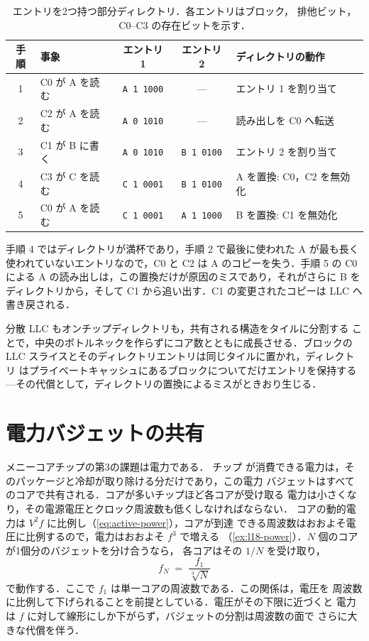 \documentclass[../main.tex]{subfiles}
\begin{document}
\begin{table}[htbp]
  \centering\small
  \caption{エントリを2つ持つ部分ディレクトリ．各エントリはブロック，
    排他ビット，C0--C3 の存在ビットを示す．}
  \label{tab:l22-directory-trace}
  \begin{tabular}{@{}clccl@{}}
    \toprule
    手順 & 事象 & エントリ 1 & エントリ 2 & ディレクトリの動作 \\
    \midrule
    1 & C0 が A を読む  & \texttt{A 1 1000} & ---               & エントリ 1 を割り当て \\
    2 & C2 が A を読む  & \texttt{A 0 1010} & ---               & 読み出しを C0 へ転送 \\
    3 & C1 が B に書く  & \texttt{A 0 1010} & \texttt{B 1 0100} & エントリ 2 を割り当て \\
    4 & C3 が C を読む  & \texttt{C 1 0001} & \texttt{B 1 0100} & A を置換: C0，C2 を無効化 \\
    5 & C0 が A を読む  & \texttt{C 1 0001} & \texttt{A 1 1000} & B を置換: C1 を無効化 \\
    \bottomrule
  \end{tabular}
\end{table}

手順 4 ではディレクトリが満杯であり，手順 2 で最後に使われた A が最も長く
使われていないエントリなので，C0 と C2 は A のコピーを失う．手順 5 の C0
による A の読み出しは，この置換だけが原因のミスであり，それがさらに B を
ディレクトリから，そして C1 から追い出す．C1 の変更されたコピーは LLC へ
書き戻される．

\begin{keypoint}
  分散 LLC もオンチップディレクトリも，共有される構造をタイルに分割する
  ことで，中央のボトルネックを作らずにコア数とともに成長させる．ブロックの
  LLC スライスとそのディレクトリエントリは同じタイルに置かれ，ディレクトリ
  はプライベートキャッシュにあるブロックについてだけエントリを保持する
  ---その代償として，ディレクトリの置換によるミスがときおり生じる．
\end{keypoint}

\section{電力バジェットの共有}
\label{sec:l22-power}

メニーコアチップの第3の課題は電力である．
チップ
が消費できる電力は，そのパッケージと冷却が取り除ける分だけであり，この電力
バジェットはすべてのコアで共有される．コアが多いチップほど各コアが受け取る
電力は小さくなり，その電源電圧とクロック周波数も低くしなければならない．
コアの動的電力は $V^{2}f$ に比例し（\cref{eq:active-power}），コアが到達
できる周波数はおおよそ電圧に比例するので，電力はおおよそ $f^{3}$ で増える
（\cref{ex:l18-power}）．$N$ 個のコアが1個分のバジェットを分け合うなら，
各コアはその $1/N$ を受け取り，
\begin{equation}
  f_{N} \;=\; \frac{f_{1}}{\sqrt[3]{N}}
  \label{eq:l22-freq}
\end{equation}
で動作する．ここで $f_{1}$ は単一コアの周波数である．この関係は，電圧を
周波数に比例して下げられることを前提としている．電圧がその下限に近づくと
電力は $f$ に対して線形にしか下がらず，バジェットの分割は周波数の面で
さらに大きな代償を伴う．
\end{document}
